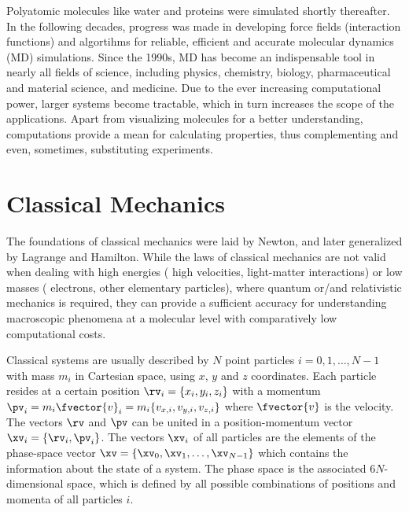 Polyatomic molecules like water\cite{ST74.1} and proteins\cite{MC77.1} were simulated 
shortly thereafter. In the following decades, progress was made in
developing force fields (interaction functions) and algortihms
for reliable, efficient and accurate molecular dynamics (MD) simulations.
Since the 1990s, MD has become 
an indispensable tool in 
nearly all fields
of science,
including
physics, chemistry, biology, pharmaceutical and material science, and medicine.
%
Due to the ever increasing computational power, larger systems become tractable, 
which in turn increases the scope of the applications.
Apart from visualizing molecules for a better understanding, 
computations
provide a mean for calculating properties, thus complementing
and even, sometimes, substituting experiments.



\section{Classical Mechanics}

The foundations of classical mechanics were laid by Newton,\cite{NE99.1} 
and later 
generalized 
by Lagrange and Hamilton.\phicom{[REF]}
While the laws of classical mechanics are not valid when
dealing with high energies (\eg{} high velocities, light-matter interactions)
or low masses (\eg{} electrons, other elementary particles), where quantum or/and relativistic
mechanics is required, they can provide 
a sufficient accuracy for understanding
macroscopic phenomena at a molecular level with 
comparatively low computational costs.



Classical systems are usually described by $N$ point particles $i=0,1,\dots,N-1$
with mass $m_i$ in Cartesian space, \ie{} using $x$, $y$ and $z$ coordinates.
Each particle resides at a certain position $\rv_i=\{x_i, y_i, z_i\}$ with a
momentum $\pv_i=m_i\fvector{v}_i=m_i\{v_{x,i},v_{y,i},v_{z,i}\}$ where $\fvector{v}$
is the velocity. The vectors $\rv$ and $\pv$ can be united in a position-momentum vector $\xv_i=\{\rv_i,\pv_i\}$.
The vectors $\xv_i$ of all particles are the elements of the phase-space vector $\xv=\{\xv_0, \xv_1,\dots,\xv_{N-1}\}$ which contains the information about the state of a system. 
The phase space
is the associated $6N$-dimensional space, which 
is defined by all possible combinations of 
positions and momenta of all
particles $i$.


